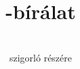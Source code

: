\documentclass[a4paper,12pt]{article}
\title{\Dolgozattipus{}-bírálat}
\author{\jelolt \\szigorló \kepzes{} részére}
\date{}
\begin{document}
\maketitle









\alairas
\end{document}

